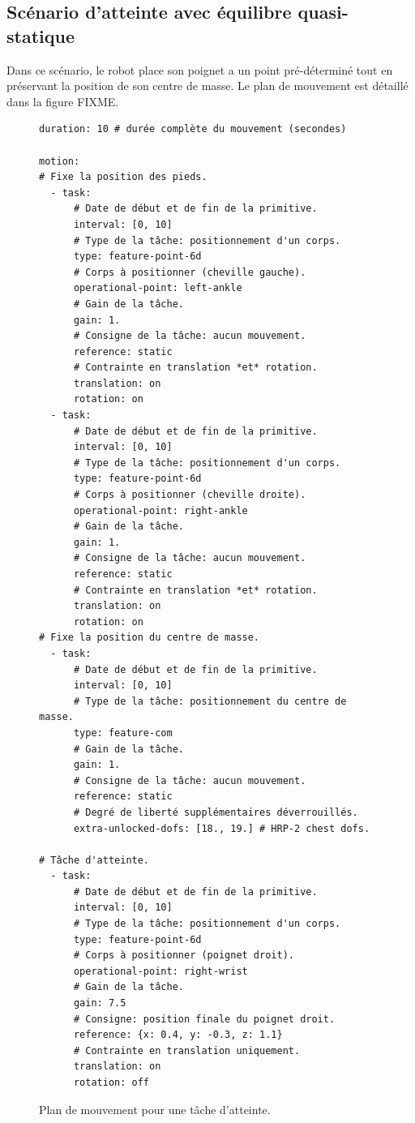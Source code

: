 \FloatBarrier

\subsection{Scénario d'atteinte avec équilibre quasi-statique}

Dans ce scénario, le robot place son poignet a un point pré-déterminé
tout en préservant la position de son centre de masse. Le plan de
mouvement est détaillé dans la figure FIXME.

\begin{figure}
  \footnotesize
  \begin{center}
\begin{verbatim}
duration: 10 # durée complète du mouvement (secondes)

motion:
# Fixe la position des pieds.
  - task:
      # Date de début et de fin de la primitive.
      interval: [0, 10]
      # Type de la tâche: positionnement d'un corps.
      type: feature-point-6d
      # Corps à positionner (cheville gauche).
      operational-point: left-ankle
      # Gain de la tâche.
      gain: 1.
      # Consigne de la tâche: aucun mouvement.
      reference: static
      # Contrainte en translation *et* rotation.
      translation: on
      rotation: on
  - task:
      # Date de début et de fin de la primitive.
      interval: [0, 10]
      # Type de la tâche: positionnement d'un corps.
      type: feature-point-6d
      # Corps à positionner (cheville droite).
      operational-point: right-ankle
      # Gain de la tâche.
      gain: 1.
      # Consigne de la tâche: aucun mouvement.
      reference: static
      # Contrainte en translation *et* rotation.
      translation: on
      rotation: on
# Fixe la position du centre de masse.
  - task:
      # Date de début et de fin de la primitive.
      interval: [0, 10]
      # Type de la tâche: positionnement du centre de masse.
      type: feature-com
      # Gain de la tâche.
      gain: 1.
      # Consigne de la tâche: aucun mouvement.
      reference: static
      # Degré de liberté supplémentaires déverrouillés.
      extra-unlocked-dofs: [18., 19.] # HRP-2 chest dofs.

# Tâche d'atteinte.
  - task:
      # Date de début et de fin de la primitive.
      interval: [0, 10]
      # Type de la tâche: positionnement d'un corps.
      type: feature-point-6d
      # Corps à positionner (poignet droit).
      operational-point: right-wrist
      # Gain de la tâche.
      gain: 7.5
      # Consigne: position finale du poignet droit.
      reference: {x: 0.4, y: -0.3, z: 1.1}
      # Contrainte en translation uniquement.
      translation: on
      rotation: off
\end{verbatim}
  \end{center}
  \caption{Plan de mouvement pour une tâche d'atteinte.}
\end{figure}

